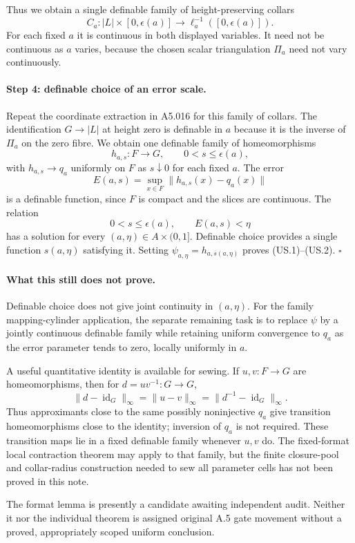 Thus we obtain a single definable family of height-preserving collars
\[
 C_a:|L|\times[0,\epsilon(a)]
       \longrightarrow\ell_a^{-1}([0,\epsilon(a)]).
\]
For each fixed $a$ it is continuous in both displayed variables. It need
not be continuous as $a$ varies, because the chosen scalar triangulation
$\Pi_a$ need not vary continuously.

\paragraph{Step 4: definable choice of an error scale.}
Repeat the coordinate extraction in A5.016 for this family of collars.
The identification $G\to|L|$ at height zero is definable in $a$ because
it is the inverse of $\Pi_a$ on the zero fibre. We obtain one definable
family of homeomorphisms
\[
 h_{a,s}:F\longrightarrow G,
 \qquad 0<s\le\epsilon(a),
\]
with $h_{a,s}\to q_a$ uniformly on $F$ as $s\downarrow0$ for each fixed
$a$. The error
\[
 E(a,s)=\sup_{x\in F}\|h_{a,s}(x)-q_a(x)\|
\]
is a definable function, since $F$ is compact and the slices are
continuous. The relation
\[
 0<s\le\epsilon(a),\qquad E(a,s)<\eta
\]
has a solution for every $(a,\eta)\in A\times(0,1]$. Definable choice
provides a single function $s(a,\eta)$ satisfying it. Setting
$\psi_{a,\eta}=h_{a,s(a,\eta)}$ proves (US.1)--(US.2).
\hfill$\square$

\paragraph{What this still does not prove.}
Definable choice does not give joint continuity in $(a,\eta)$. For the
family mapping-cylinder application, the separate remaining task is to
replace $\psi$ by a jointly continuous definable family while retaining
uniform convergence to $q_a$ as the error parameter tends to zero,
locally uniformly in $a$.

A useful quantitative identity is available for sewing. If
$u,v:F\to G$ are homeomorphisms, then for $d=uv^{-1}:G\to G$,
\[
 \|d-\operatorname{id}_G\|_\infty
   =\|u-v\|_\infty
   =\|d^{-1}-\operatorname{id}_G\|_\infty.
 \tag{US.5}
\]
Thus approximants close to the same possibly noninjective $q_a$ give
transition homeomorphisms close to the identity; inversion of $q_a$ is
not required. These transition maps lie in a fixed definable family
whenever $u,v$ do. The fixed-format local contraction theorem may apply
to that family, but the finite closure-pool and collar-radius construction
needed to sew all parameter cells has not been proved in this note.

The format lemma is presently a candidate awaiting independent audit.
Neither it nor the individual theorem is assigned original A.5 gate
movement without a proved, appropriately scoped uniform conclusion.
